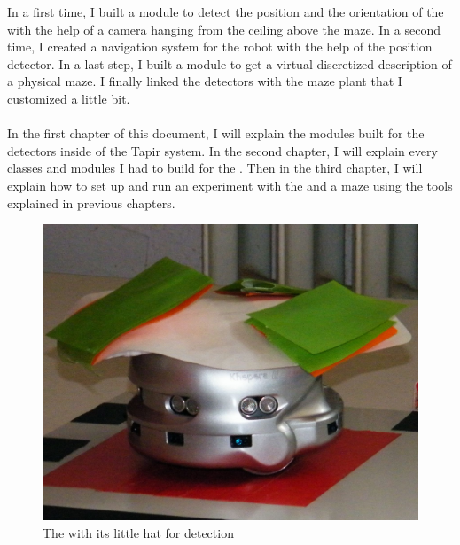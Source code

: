 In a first time, I built a module to detect the position and the 
orientation of the \khepera{} with the help of a camera hanging from 
the ceiling above the maze. In a second time, I created a navigation 
system for the robot with the help of the position detector. In a 
last step, I built a module to get a virtual discretized description 
of a physical maze. I finally linked the detectors with the maze plant 
that I customized a little bit.
\\
\\
In the first chapter of this document, I will explain the modules built 
for the detectors inside of the Tapir system. In the second chapter, 
I will explain every classes and modules I had to build for the \clsquare{}.
Then in the third chapter, I will explain how to set up and run an 
experiment with the \khepera{} and a maze using the tools explained 
in previous chapters. 

\begin{figure}
    \begin{center}
        \includegraphics[width=\textwidth]{./img/kheperacrop.png}
        \caption[The \khepera{}]{%
        The \khepera{} with its little hat for detection}
    \end{center}
\end{figure}

